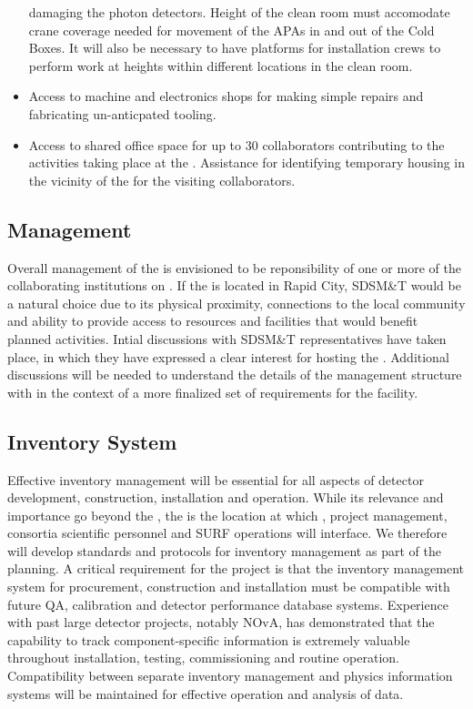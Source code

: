 \begin{itemize}
    damaging the photon detectors.  Height of the clean room must
    accomodate crane coverage needed for movement of the APAs in and
    out of the Cold Boxes.  It will also be necessary to have
    platforms for installation crews to perform work at heights within
    different locations in the clean room.
  \item Access to machine and electronics shops for making simple
    repairs and fabricating un-anticpated tooling.
  \item Access to shared office space for up to 30 collaborators
    contributing to the activities taking place at the .
    Assistance for identifying temporary housing in the vicinity of
    the  for the visiting collaborators.
\end{itemize}

\subsection{Management}

Overall management of the  is envisioned to be
reponsibility of one or more of the collaborating institutions on
.  If the  is located in Rapid City, SDSM\&T
would be a natural choice due to its physical proximity, connections
to the local community and ability to provide access to resources and
facilities that would benefit planned  activities.  Intial
discussions with SDSM\&T representatives have taken place, in which
they have expressed a clear interest for hosting the .
Additional discussions will be needed to understand the details of the
 management structure with in the context of a more
finalized set of requirements for the facility.

\subsection{Inventory System}

Effective inventory management will be essential for all aspects of
 detector development, construction, installation and
operation.  While its relevance and importance go beyond the
, the  is the location at
which ,  project management, consortia
scientific personnel and SURF operations will interface.  We therefore
will develop standards and protocols for inventory management as part
of the  planning.  A critical requirement for the project
is that the inventory management system for procurement, construction
and installation must be compatible with future QA, calibration and
detector performance database systems.  Experience with past large
detector projects, notably NOvA, has demonstrated that the capability
to track component-specific information is extremely valuable
throughout installation, testing, commissioning and routine operation.
Compatibility between separate inventory management and physics
information systems will be maintained for effective operation and
analysis of  data.

